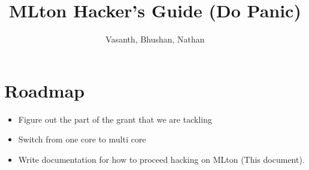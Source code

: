 \documentclass{article}
\title{MLton Hacker's Guide (Do Panic)}
\author{Vasanth, Bhushan, Nathan}
\date{}
\begin{document}
\maketitle
\section{Roadmap}
\begin{itemize}
\item Figure out the part of the grant that we are tackling
\item Switch from one core to multi core
\item Write documentation for how to proceed hacking on MLton (This document).
\end{itemize}
\end{document}
